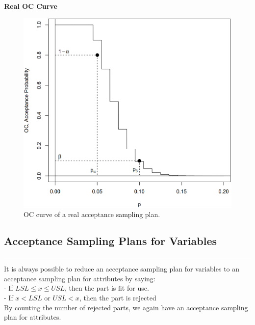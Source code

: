 \textbf{Real OC Curve}
\begin{figure}[H]
  \centering
  \includegraphics[width=0.8\linewidth]{Pics/5.1.4.png}
  \caption{OC curve of a real acceptance sampling plan.}
\end{figure}


\subsection{Acceptance Sampling Plans for Variables}
\noindent\rule[\linienAbstand]{\linewidth}{\linienDicke}
It is always possible to reduce an acceptance sampling plan for variables to an acceptance sampling plan for attributes by saying:\\

- If $LSL \leq x \leq USL$, then the part is fit for use.\\
- If $x < LSL \text{ or } USL < x$, then the part is rejected\\

By counting the number of rejected parts, we again have an acceptance sampling plan for attributes.
